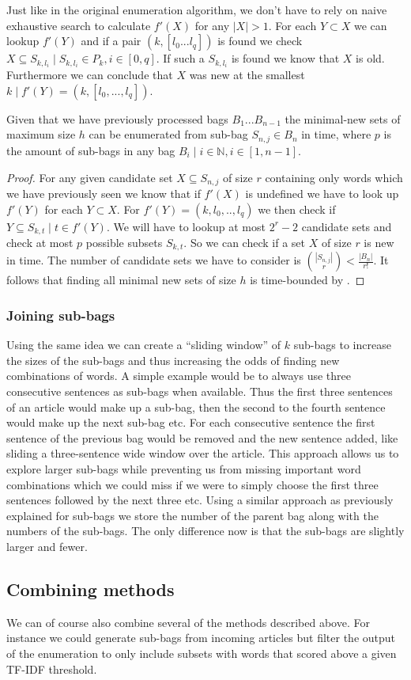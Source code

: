 Just like in the original enumeration algorithm, we don't have to rely on naive exhaustive search to calculate $f'(X)$ for any $|X|>1$. For each $Y\subset X$ we can lookup $f'(Y)$ and if a pair $(k, [l_{0}... l_{q}])$ is found we check $X \subseteq S_{k, l_{i}} \mid S_{k, l_{i}} \in P_{k}, i\in[0,q]$. If such a $S_{k,l_{i}}$ is found we know that $X$ is old. Furthermore we can conclude that $X$ was new at the smallest $k \mid f'(Y)=(k, [l_{0},..., l_{q}])$.

\begin{theorem}
  Given that we have previously processed bags $B_{1}...B_{n-1}$ the minimal-new sets of maximum size $h$ can be enumerated from sub-bag $S_{n, j}\in B_{n}$ in  time, where $p$ is the amount of sub-bags in any bag $B_{i} \mid i \in \mathbb{N}, i \in [1,n-1]$.
\end{theorem}
\begin{proof}
  For any given candidate set $X \subseteq S_{n, j}$ of size $r$ containing only words which we have previously seen we know that if $f'(X)$ is undefined we have to look up $f'(Y)$ for each $Y \subset X$. For $f'(Y) = (k, l_{0},..,l_{q})$ we then check if $Y \subseteq S_{k, t} \mid t \in f'(Y)$. We will have to lookup at most $2^{r}-2$ candidate sets and check at most $p$ possible subsets $S_{k, t}$. So we can check if a set $X$ of size $r$ is new in  time. The number of candidate sets we have to consider is $\binom{|S_{n, j}|}{r} < \frac{|B_{n}|}{r!}$. It follows that finding all minimal new sets of size $h$ is time-bounded by .
\end{proof}

\subsubsection{Joining sub-bags}
Using the same idea we can create a ``sliding window'' of $k$ sub-bags to increase the sizes of the sub-bags and thus increasing the odds of finding new combinations of words. A simple example would be to always use three consecutive sentences as sub-bags when available. Thus the first three sentences of an article would make up a sub-bag, then the second to the fourth sentence would make up the next sub-bag etc. For each consecutive sentence the first sentence of the previous bag would be removed and the new sentence added, like sliding a three-sentence wide window over the article. This approach allows us to explore larger sub-bags while preventing us from missing important word combinations which we could miss if we were to simply choose the first three sentences followed by the next three etc. Using a similar approach as previously explained for sub-bags we store the number of the parent bag along with the numbers of the sub-bags. The only difference now is that the sub-bags are slightly larger and fewer.

\subsection{Combining methods}
We can of course also combine several of the methods described above. For instance we could generate sub-bags from incoming articles but filter the output of the enumeration to only include subsets with words that scored above a given TF-IDF threshold.
